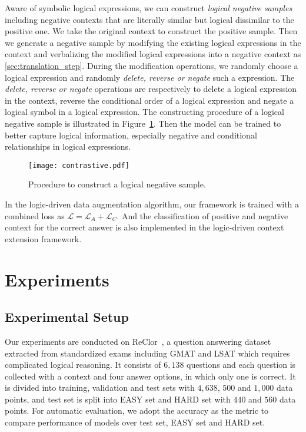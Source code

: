 \documentclass[11pt,a4paper]{article}
\begin{document}
Aware of symbolic logical expressions, we can construct \emph{logical negative samples} including negative contexts that are literally similar but logical dissimilar to the positive one. 
We take the original context to construct the positive sample. Then we generate a negative sample by modifying the existing logical expressions in the context and verbalizing the modified logical expressions into a negative context as \cref{sec:translation_step}. During the modification operations, we randomly choose a logical expression and randomly \emph{delete, reverse or negate} such a expression. The \emph{delete, reverse or negate} operations are respectively to delete a logical expression in the context, reverse the conditional order of a logical expression and negate a logical symbol in a logical expression.
The constructing procedure of a logical negative sample is illustrated in Figure~\ref{figure_contrastive}. Then the model can be trained to better capture logical information, especially negative and conditional relationships in logical expressions.
\begin{figure}[!th]
\centering
\texttt{[image: contrastive.pdf]}
\caption{\label{figure_contrastive} Procedure to construct a logical negative sample.}
\end{figure}


In the logic-driven data augmentation algorithm, our framework is trained with a combined loss as $\mathcal{L}=\mathcal{L}_A+\mathcal{L}_C$. And the classification of positive and negative context for the correct answer is also implemented in the logic-driven context extension framework.


\section{Experiments}
\subsection{Experimental Setup}
Our experiments are conducted on ReClor~\cite{yu2020reclor}, a question answering dataset extracted from standardized exams including GMAT and LSAT which requires complicated logical reasoning. It consists of $6,138$ questions and each question is collected with a context and four answer options, in which only one is correct. It is divided into training, validation and test sets with $4,638$, $500$ and $1,000$ data points, and test set is split into EASY set and HARD set with $440$ and $560$ data points. For automatic evaluation, we adopt the accuracy as the metric to compare performance of models over test set, EASY set and HARD set.
 
\end{document}
